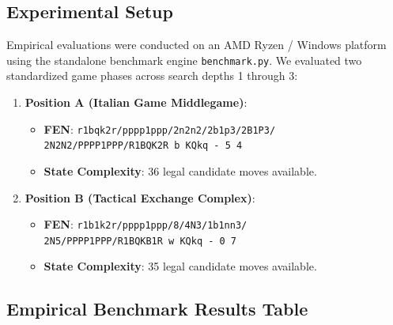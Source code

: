 \documentclass[11pt,a4paper]{article}
\begin{document}
\subsection{Experimental Setup}
Empirical evaluations were conducted on an AMD Ryzen / Windows platform using the standalone benchmark engine \texttt{benchmark.py}. We evaluated two standardized game phases across search depths 1 through 3:
\begin{enumerate}[leftmargin=*]
    \item \textbf{Position A (Italian Game Middlegame)}:
    \begin{itemize}[leftmargin=1.5em]
        \item \textbf{FEN}: \texttt{r1bqk2r/pppp1ppp/2n2n2/2b1p3/2B1P3/} \\
              \hspace*{0.9cm}\texttt{2N2N2/PPPP1PPP/R1BQK2R b KQkq - 5 4}
        \item \textbf{State Complexity}: 36 legal candidate moves available.
    \end{itemize}
    \item \textbf{Position B (Tactical Exchange Complex)}:
    \begin{itemize}[leftmargin=1.5em]
        \item \textbf{FEN}: \texttt{r1b1k2r/pppp1ppp/8/4N3/1b1nn3/} \\
              \hspace*{0.9cm}\texttt{2N5/PPPP1PPP/R1BQKB1R w KQkq - 0 7}
        \item \textbf{State Complexity}: 35 legal candidate moves available.
    \end{itemize}
\end{enumerate}

\subsection{Empirical Benchmark Results Table}
\end{document}
